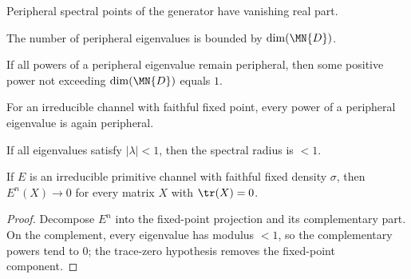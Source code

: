 \begin{theorem}
    \leanok
    Peripheral spectral points of the generator have vanishing real part.
\end{theorem}

\begin{theorem}
    \leanok
    The number of peripheral eigenvalues is bounded by $\dim(\MN{D})$.
\end{theorem}

\begin{theorem}
    \leanok
    If all powers of a peripheral eigenvalue remain peripheral, then some
    positive power not exceeding $\dim(\MN{D})$ equals $1$.
\end{theorem}

\begin{theorem}
    \leanok
    For an irreducible channel with faithful fixed point, every power of a
    peripheral eigenvalue is again peripheral.
\end{theorem}

\begin{theorem}
    \label{thm:spectralRadius_lt_one_of_eigenvalues_lt_one}
    \leanok
    If all eigenvalues satisfy $|\lambda|<1$, then the spectral radius is $<1$.
\end{theorem}

\begin{theorem}
    \label{thm:primitive_channel_pow_tendsto_zero_ch12}
    \leanok
    If $E$ is an irreducible primitive channel with faithful fixed density $\sigma$,
    then $E^n(X)\to 0$ for every matrix $X$ with $\tr(X)=0$.
\end{theorem}

\begin{proof}
    \leanok
    Decompose $E^n$ into the fixed-point projection and its complementary part.
    On the complement, every eigenvalue has modulus $<1$, so the complementary powers
    tend to $0$; the trace-zero hypothesis removes the fixed-point component.
\end{proof}

